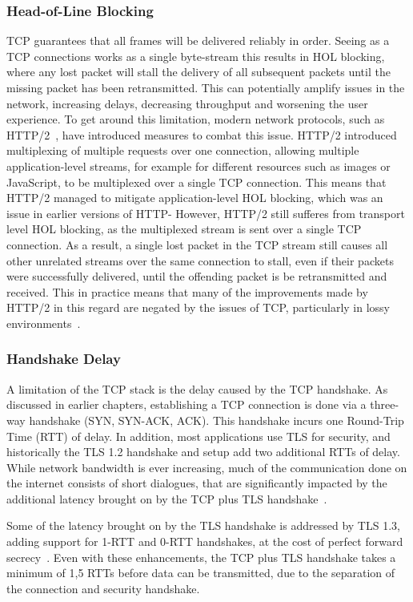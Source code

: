 \documentclass[english, 12pt, a4paper, elec, utf8, a-2b, online]{aaltothesis}
\begin{document}
\subsubsection{Head-of-Line Blocking}
\label{sec:hol}
TCP guarantees that all frames will be delivered reliably in order. Seeing
as a TCP connections works as a single byte-stream this results in HOL blocking,
where any lost packet will stall the delivery of
all subsequent packets until the missing packet has been retransmitted. This
can potentially amplify issues in the network, increasing delays, decreasing
throughput and worsening the user experience. To get around this limitation, modern
network protocols, such as HTTP/2~\cite{rfc9113}, have introduced measures to
combat this issue. HTTP/2 introduced multiplexing of multiple requests over one
connection, allowing multiple application-level streams, for example for different
resources such as images or JavaScript, to be multiplexed over a single TCP
connection. This means that HTTP/2 managed to mitigate application-level HOL
blocking, which was an issue in earlier versions of HTTP- However, HTTP/2 still
sufferes from transport level HOL blocking, as the multiplexed stream is
sent over a single TCP connection. As a result, a single lost packet in the TCP
stream still causes all other unrelated streams over the same connection to stall,
even if their packets were successfully delivered, until the offending packet
is be retransmitted and received. This in practice means that many of the improvements made
by HTTP/2 in this regard are negated by the issues of TCP, particularly in lossy
environments~\cite{http2_vs_1}.

\subsubsection{Handshake Delay}
A limitation of the TCP stack is the delay caused by the TCP handshake. As discussed
in earlier chapters, establishing a TCP connection is done via a three-way handshake
(SYN, SYN-ACK, ACK). This handshake incurs one Round-Trip Time (RTT) of delay. In
addition, most applications use TLS for security, and historically the TLS 1.2 handshake
and setup add two additional RTTs of delay. While network bandwidth is ever increasing,
much of the communication done on the internet consists of short dialogues, that
are significantly impacted by the additional latency brought on by the TCP plus TLS
handshake~\cite{quic_transport_protocol_design}.

Some of the latency brought on by the TLS handshake is addressed by TLS 1.3, adding
support for 1-RTT and 0-RTT handshakes, at the cost of perfect forward secrecy~\cite{rfc8446}. Even with
these enhancements, the TCP plus TLS handshake takes a minimum of 1,5 RTTs before data can be
transmitted, due to the separation of the connection and security handshake.
\end{document}
